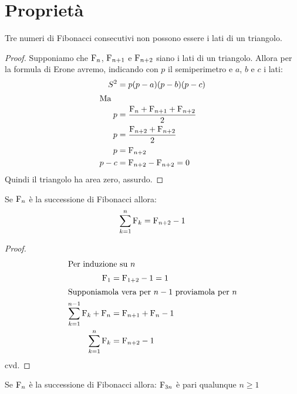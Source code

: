 \section{Proprietà}
\begin{thm}
	Tre numeri di Fibonacci consecutivi non possono essere i lati di un
	triangolo.
\end{thm}
\begin{proof}
	Supponiamo che $\mathrm{F}_{n}$, $\mathrm{F}_{n+1}$ e $\mathrm{F}_{n+2}$ siano i lati di un
	triangolo. Allora per la formula di Erone avremo, indicando con $p$
	il semiperimetro e $a$, $b$ e $c$ i lati:
	\begin{align*}
		S^2={} & p(p-a)(p-b)(p-c)                       \\
		\intertext{Ma}
		p={}   & \dfrac{\mathrm{F}_{n}+\mathrm{F}_{n+1}+\mathrm{F}_{n+2}}{2} \\
		p={}   & \dfrac{\mathrm{F}_{n+2}+\mathrm{F}_{n+2}}{2}         \\
		p={}   & \mathrm{F}_{n+2}                              \\
		p-c={} & \mathrm{F}_{n+2}-\mathrm{F}_{n+2}=0                  \\
	\end{align*}
	Quindi il triangolo ha area zero, assurdo.
\end{proof}
\begin{thm}
	Se $\mathrm{F}_{n}$ è la successione di Fibonacci allora:
	\begin{equation}
		\sum_{k=1}^{n}\mathrm{F}_{k}=\mathrm{F}_{n+2}-1
	\end{equation}\label{eqn:FibSommaNumeri}
\end{thm}
\begin{proof}
	\begin{align*}
		\intertext{Per induzione su $n$}
		\mathrm{F}_{1}={}                         & \mathrm{F}_{1+2}-1=1       \\
		\intertext{Supponiamola vera per $n-1$ proviamola per $n$}
		\sum_{k=1}^{n-1}\mathrm{F}_{k}+\mathrm{F}_{n}={} & \mathrm{F}_{n+1}+\mathrm{F}_{n}-1 \\
		\sum_{k=1}^{n}\mathrm{F}_{k}={}           & \mathrm{F}_{n+2}-1         \\
	\end{align*}
	cvd.
\end{proof}
\begin{thm}
	Se $\mathrm{F}_{n}$ è la successione di Fibonacci allora:
	$\mathrm{F}_{3n}$ è pari qualunque $n\geq1$\label{eqn:Fib3npari}
\end{thm}
